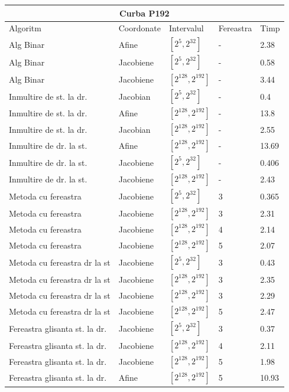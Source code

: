 \begin{tabular}{ |p{5cm}||p{3cm}|p{3cm}|p{2cm}|p{1cm}|  }
 \hline
 \multicolumn{5}{|c|}{Curba P192} \\
 \hline
 Algoritm& Coordonate &Intervalul &Fereastra &Timp\\
 \hline
 Alg Binar & Afine  &$[2^{5},2^{32}]$& - & 2.38\\
 Alg Binar&Jacobiene  & $[2^{5},2^{32}]$ & - & 0.58\\
 Alg Binar&Jacobiene  & $[2^{128},2^{192}]$ & - & 3.44\\
 Inmultire de st. la dr. & Jacobian & $[2^{5},2^{32}]$& - & 0.4\\
 Inmultire de st. la dr. & Afine & $[2^{128},2^{192}]$& - & 13.8\\
 Inmultire de st. la dr. & Jacobian & $[2^{128},2^{192}]$& - & 2.55\\
 Inmultire de dr. la st. &Afine & $[2^{128},2^{192}]$ & - & 13.69\\
 Inmultire de dr. la st. &Jacobiene & $[2^{5},2^{32}]$ & - & 0.406\\
 Inmultire de dr. la st. &Jacobiene & $[2^{128},2^{192}]$ & - & 2.43\\
 Metoda cu fereastra& Jacobiene & $[2^{5},2^{32}]$ & 3 & 0.365\\
 Metoda cu fereastra& Jacobiene & $[2^{128},2^{192}]$ & 3 & 2.31\\
 Metoda cu fereastra& Jacobiene & $[2^{128},2^{192}]$ & 4 & 2.14\\
 Metoda cu fereastra& Jacobiene & $[2^{128},2^{192}]$ & 5 & 2.07\\
 Metoda cu fereastra dr la st& Jacobiene & $[2^{5},2^{32}]$ & 3 & 0.43\\
 Metoda cu fereastra dr la st& Jacobiene & $[2^{128},2^{192}]$ & 3 & 2.35\\
 Metoda cu fereastra dr la st& Jacobiene & $[2^{128},2^{192}]$ & 3 & 2.29\\
 Metoda cu fereastra dr la st& Jacobiene & $[2^{128},2^{192}]$ & 5 & 2.47\\
 Fereastra glisanta st. la dr.& Jacobiene  & $[2^{5},2^{32}]$& 3 & 0.37\\
 Fereastra glisanta st. la dr.& Jacobiene  & $[2^{128},2^{192}]$& 4 & 2.11\\
 Fereastra glisanta st. la dr.& Jacobiene  & $[2^{128},2^{192}]$& 5 & 1.98\\
 Fereastra glisanta st. la dr.& Afine  & $[2^{128},2^{192}]$& 5 & 10.93 \\
 \hline
\end{tabular}

